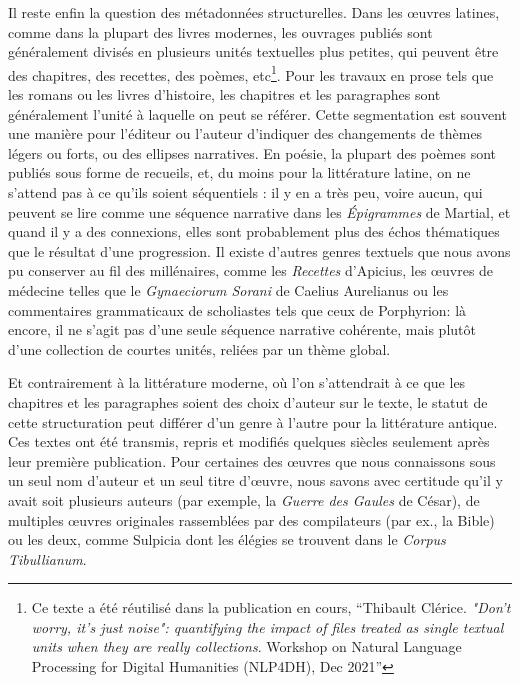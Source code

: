 Il reste enfin la question des métadonnées structurelles. Dans les œuvres latines, comme dans la plupart des livres modernes, les ouvrages publiés sont généralement divisés en plusieurs unités textuelles plus petites, qui peuvent être des chapitres, des recettes, des poèmes, etc\footnote{Ce texte a été réutilisé dans la publication en cours, \enquote{Thibault Clérice. \textit{"Don't worry, it's just noise": quantifying the impact of files treated as single textual units when they are really collections}. Workshop on Natural Language Processing for Digital Humanities (NLP4DH), Dec 2021}}. Pour les travaux en prose tels que les romans ou les livres d'histoire, les chapitres et les paragraphes sont généralement l'unité à laquelle on peut se référer. Cette segmentation est souvent une manière pour l'éditeur ou l'auteur d'indiquer des changements de thèmes légers ou forts, ou des ellipses narratives. En poésie, la plupart des poèmes sont publiés sous forme de recueils, et, du moins pour la littérature latine, on ne s'attend pas à ce qu'ils soient séquentiels : il y en a très peu, voire aucun, qui peuvent se lire comme une séquence narrative dans les \textit{Épigrammes} de Martial, et quand il y a des connexions, elles sont probablement plus des échos thématiques que le résultat d'une progression. Il existe d'autres genres textuels que nous avons pu conserver au fil des millénaires, comme les \textit{Recettes} d'Apicius, les œuvres de médecine telles que le \textit{Gynaeciorum Sorani} de Caelius Aurelianus ou les commentaires grammaticaux de scholiastes tels que ceux de Porphyrion: là encore, il ne s'agit pas d'une seule séquence narrative cohérente, mais plutôt d'une collection de courtes unités, reliées par un thème global. 

Et contrairement à la littérature moderne, où l'on s'attendrait à ce que les chapitres et les paragraphes soient des choix d'auteur sur le texte, le statut de cette structuration peut différer d'un genre à l'autre pour la littérature antique. Ces textes ont été transmis, repris et modifiés quelques siècles seulement après leur première publication. Pour certaines des œuvres que nous connaissons sous un seul nom d'auteur et un seul titre d'œuvre, nous savons avec certitude qu'il y avait soit plusieurs auteurs (par exemple, la \textit{Guerre des Gaules} de César), de multiples œuvres originales rassemblées par des compilateurs (par ex., la Bible) ou les deux, comme Sulpicia dont les élégies se trouvent dans le \textit{Corpus Tibullianum}. 

